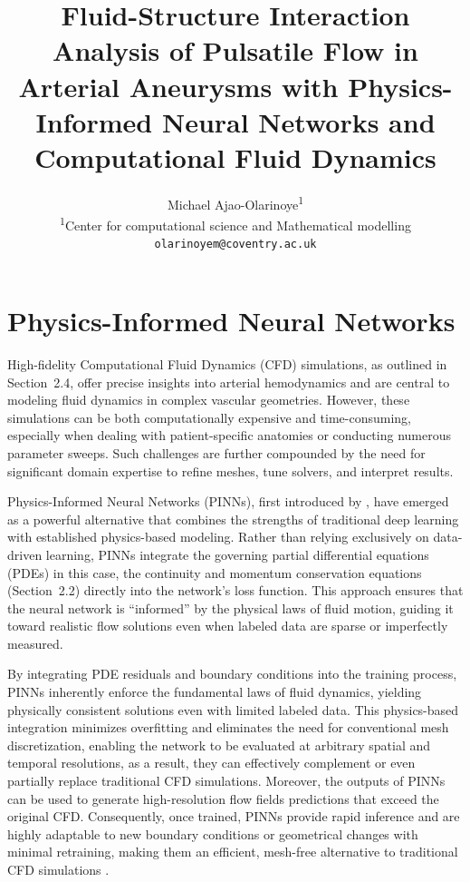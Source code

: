 \documentclass[12pt, a4paper]{article}
\title{
    \vspace{-2cm} %
    \large \textbf{Fluid-Structure Interaction Analysis of Pulsatile Flow in Arterial Aneurysms with Physics-Informed Neural Networks and Computational Fluid Dynamics}\\
}
\author{
    Michael Ajao-Olarinoye\textsuperscript{1} \\
    \textsuperscript{1}Center for computational science and Mathematical modelling \\
    \texttt{olarinoyem@coventry.ac.uk}
}
\date{}
\begin{document}
\maketitle



\section{Physics-Informed Neural Networks}
\label{sec:PINNs}


High-fidelity Computational Fluid Dynamics (CFD) simulations, as outlined in Section~2.4, offer precise insights into arterial hemodynamics and are central to modeling fluid dynamics in complex vascular geometries. However, these simulations can be both computationally expensive and time-consuming, especially when dealing with patient-specific anatomies or conducting numerous parameter sweeps. Such challenges are further compounded by the need for significant domain expertise to refine meshes, tune solvers, and interpret results.

Physics-Informed Neural Networks (PINNs), first introduced by \citet{raissi2019physics}, have emerged as a powerful alternative that combines the strengths of traditional deep learning with established physics-based modeling. Rather than relying exclusively on data-driven learning, PINNs integrate the governing partial differential equations (PDEs) in this case, the continuity and momentum conservation equations (Section~2.2) directly into the network's loss function. This approach ensures that the neural network is ``informed'' by the physical laws of fluid motion, guiding it toward realistic flow solutions even when labeled data are sparse or imperfectly measured.

By integrating PDE residuals and boundary conditions into the training process, PINNs inherently enforce the fundamental laws of fluid dynamics, yielding physically consistent solutions even with limited labeled data. This physics-based integration minimizes overfitting and eliminates the need for conventional mesh discretization, enabling the network to be evaluated at arbitrary spatial and temporal resolutions, as a result, they can effectively complement or even partially replace traditional CFD simulations. Moreover, the outputs of PINNs can be used to generate high-resolution flow fields predictions that exceed the original CFD. Consequently, once trained, PINNs provide rapid inference and are highly adaptable to new boundary conditions or geometrical changes with minimal retraining, making them an efficient, mesh-free alternative to traditional CFD simulations \citep{jagtap2020extended}.
\end{document}

